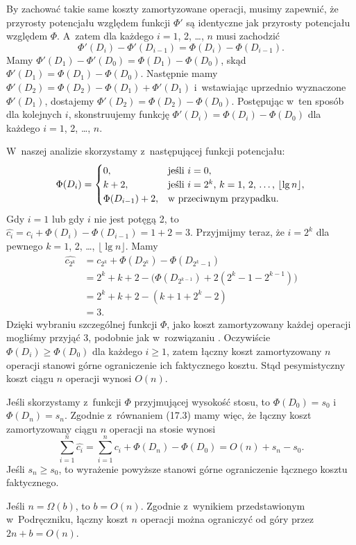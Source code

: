 
\exercise %
By zachować takie same koszty zamortyzowane operacji, musimy zapewnić, że przyrosty potencjału względem funkcji $\Phi'$ są identyczne jak przyrosty potencjału względem $\Phi$.
A~zatem dla każdego $i=1$, 2, \dots, $n$ musi zachodzić
\[
	\Phi'(D_i)-\Phi'(D_{i-1}) = \Phi(D_i)-\Phi(D_{i-1}).
\]
Mamy $\Phi'(D_1)-\Phi'(D_0)=\Phi(D_1)-\Phi(D_0)$, skąd $\Phi'(D_1)=\Phi(D_1)-\Phi(D_0)$.
Następnie mamy $\Phi'(D_2)=\Phi(D_2)-\Phi(D_1)+\Phi'(D_1)$ i~wstawiając uprzednio wyznaczone $\Phi'(D_1)$, dostajemy $\Phi'(D_2)=\Phi(D_2)-\Phi(D_0)$.
Postępując w~ten sposób dla kolejnych $i$, skonstruujemy funkcję $\Phi'(D_i)=\Phi(D_i)-\Phi(D_0)$ dla każdego $i=1$, 2, \dots, $n$.

\exercise %
W~naszej analizie skorzystamy z~następującej funkcji potencjału:
\[
	\Phi(D_i) = \begin{cases}
		0, & \text{jeśli $i=0$}, \\
		k+2, & \text{jeśli $i=2^k$, $k=1$, 2, \dots, $\lfloor\lg n\rfloor$}, \\
		\Phi(D_{i-1})+2, & \text{w~przeciwnym przypadku}.
	\end{cases}
\]
Gdy $i=1$ lub gdy $i$ nie jest potęgą 2, to $\widehat{c_i}=c_i+\Phi(D_i)-\Phi(D_{i-1})=1+2=3$.
Przyjmijmy teraz, że $i=2^k$ dla pewnego $k=1$, 2, \dots, $\lfloor\lg n\rfloor$.
Mamy
\begin{align*}
	\widehat{c_{2^k}} &= c_{2^k}+\Phi(D_{2^k})-\Phi(D_{2^k-1}) \\
	&= 2^k+k+2-\bigl(\Phi(D_{2^{k-1}})+2(2^k-1-2^{k-1})\bigr) \\
	&= 2^k+k+2-(k+1+2^k-2) \\
	&= 3.
\end{align*}
Dzięki wybraniu szczególnej funkcji $\Phi$, jako koszt zamortyzowany każdej operacji mogliśmy przyjąć 3, podobnie jak w~rozwiązaniu .
Oczywiście $\Phi(D_i)\ge\Phi(D_0)$ dla każdego $i\ge1$, zatem łączny koszt zamortyzowany $n$ operacji stanowi górne ograniczenie ich faktycznego kosztu.
Stąd pesymistyczny koszt ciągu $n$ operacji wynosi $O(n)$.

\exercise %
\exercise %
Jeśli skorzystamy z~funkcji $\Phi$ przyjmującej wysokość stosu, to $\Phi(D_0)=s_0$ i~$\Phi(D_n)=s_n$.
Zgodnie z~równaniem (17.3) mamy więc, że łączny koszt zamortyzowany ciągu $n$ operacji na stosie wynosi \[
	\sum_{i=1}^n\widehat{c_i} = \sum_{i=1}^nc_i+\Phi(D_n)-\Phi(D_0) = O(n)+s_n-s_0.
\]
Jeśli $s_n\ge s_0$, to wyrażenie powyższe stanowi górne ograniczenie łącznego kosztu faktycznego.

\exercise %
Jeśli $n=\Omega(b)$, to $b=O(n)$.
Zgodnie z~wynikiem przedstawionym w~Podręczniku, łączny koszt $n$ operacji  można ograniczyć od góry przez $2n+b=O(n)$.

\exercise %
\exercise %
